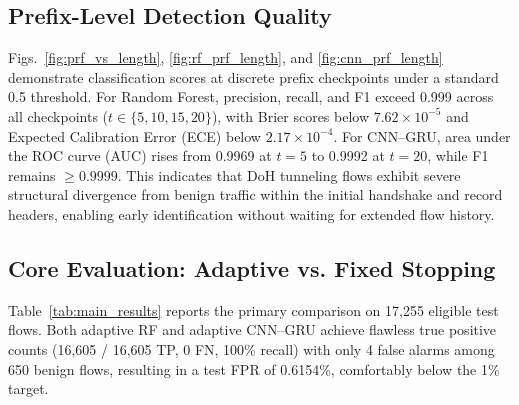 \documentclass[conference]{IEEEtran}
\begin{document}
\subsection{Prefix-Level Detection Quality}
Figs.~\ref{fig:prf_vs_length}, \ref{fig:rf_prf_length}, and \ref{fig:cnn_prf_length} demonstrate classification scores at discrete prefix checkpoints under a standard 0.5 threshold. For Random Forest, precision, recall, and F1 exceed 0.999 across all checkpoints ($t \in \{5, 10, 15, 20\}$), with Brier scores below $7.62 \times 10^{-5}$ and Expected Calibration Error (ECE) below $2.17 \times 10^{-4}$. For CNN--GRU, area under the ROC curve (AUC) rises from 0.9969 at $t=5$ to 0.9992 at $t=20$, while F1 remains $\ge 0.9999$. This indicates that DoH tunneling flows exhibit severe structural divergence from benign traffic within the initial handshake and record headers, enabling early identification without waiting for extended flow history.

\subsection{Core Evaluation: Adaptive vs. Fixed Stopping}
Table~\ref{tab:main_results} reports the primary comparison on 17,255 eligible test flows. Both adaptive RF and adaptive CNN--GRU achieve flawless true positive counts (16,605 / 16,605 TP, 0 FN, 100\% recall) with only 4 false alarms among 650 benign flows, resulting in a test FPR of 0.6154\%, comfortably below the 1\% target.
\end{document}
